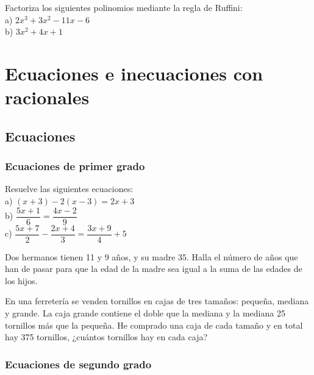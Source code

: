 \begin{ejer}
Factoriza los siguientes polinomios mediante la regla de Ruffini:\\
a) $2x^3+3x^2-11x-6$ \\
b) $3x^2+4x+1$
\end{ejer}

\section{Ecuaciones e inecuaciones con racionales}

\subsection{Ecuaciones}

\subsubsection{Ecuaciones de primer grado}

\begin{ejer}
Resuelve las siguientes ecuaciones: \\
a) $(x+3)-2(x-3)=2x+3$ \\
b) $\dfrac{5x+1}{6}=\dfrac{4x-2}{9}$ \\
c) $\dfrac{5x+7}{2}-\dfrac{2x+4}{3} = \dfrac{3x+9}{4}+5$
\end{ejer}


\begin{ejer}
Dos hermanos tienen 11 y 9 años, y su madre 35. Halla el número de años que han de pasar para que la edad de la madre sea igual a la suma de las edades de los hijos.
\end{ejer}

\begin{ejer}
En una ferretería se venden tornillos en cajas de tres tamaños: pequeña, mediana y grande. La caja grande contiene el doble que la mediana y la mediana 25 tornillos más que la pequeña. He comprado una caja de cada tamaño y en total hay 375 tornillos, ¿cuántos tornillos hay en cada caja?
\end{ejer}

\subsubsection{Ecuaciones de segundo grado}

\begin{ejer}

\end{ejer}

